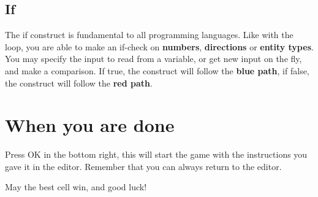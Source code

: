 \subsection*{If}

The if construct is fundamental to all programming languages. Like with the loop, you are able to make an if-check on \textbf{numbers}, \textbf{directions} or \textbf{entity types}. You may specify the input to read from a variable, or get new input on the fly, and make a comparison. If true, the construct will follow the \textbf{blue path}, if false, the construct will follow the \textbf{red path}.


\section*{When you are done}

Press OK in the bottom right, this will start the game with the instructions you gave it in the editor. Remember that you can always return to the editor.


May the best cell win, and good luck!